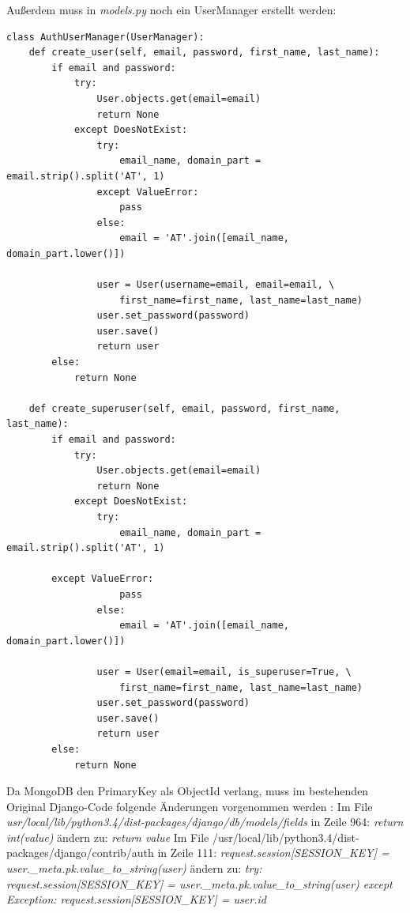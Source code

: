 Außerdem muss in \textit{models.py} noch ein UserManager erstellt werden:
\begin{lstlisting}
class AuthUserManager(UserManager):
    def create_user(self, email, password, first_name, last_name):
        if email and password:
            try:
                User.objects.get(email=email)
                return None
            except DoesNotExist:
                try:
                    email_name, domain_part = email.strip().split('AT', 1)
                except ValueError:
                    pass
                else:
                    email = 'AT'.join([email_name, domain_part.lower()])

                user = User(username=email, email=email, \
 					first_name=first_name, last_name=last_name)
                user.set_password(password)
                user.save()
                return user
        else:
            return None

    def create_superuser(self, email, password, first_name, last_name):
        if email and password:
            try:
                User.objects.get(email=email)
                return None
            except DoesNotExist:
                try:
                    email_name, domain_part = email.strip().split('AT', 1)
                
 	    except ValueError:
                    pass
                else:
                    email = 'AT'.join([email_name, domain_part.lower()])

                user = User(email=email, is_superuser=True, \
 					first_name=first_name, last_name=last_name)
                user.set_password(password)
                user.save()
                return user
        else:
            return None
\end{lstlisting}

Da MongoDB den PrimaryKey als ObjectId verlang, muss im bestehenden Original Django-Code folgende Änderungen vorgenommen werden \cite{ISSUE}:
Im File \textit{usr/local/lib/python3.4/dist-packages/django/db/models/fields} in Zeile 964: 
\textit{return int(value)}
ändern zu:
\textit{return value}
Im File /usr/local/lib/python3.4/dist-packages/django/contrib/auth in Zeile 111:
\textit{request.session[SESSION\_KEY] = user.\_meta.pk.value\_to\_string(user)}
ändern zu:
\textit{try:
 	request.session[SESSION\_KEY] = user.\_meta.pk.value\_to\_string(user)
except Exception:
 	request.session[SESSION\_KEY] = user.id}
 	
